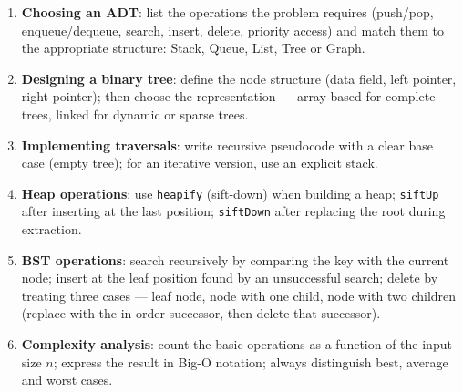 \documentclass[11pt]{article}
\begin{document}
\begin{methode}
\begin{enumerate}
\item \textbf{Choosing an ADT}: list the operations the problem requires (push/pop, enqueue/dequeue, search, insert, delete, priority access) and match them to the appropriate structure: Stack, Queue, List, Tree or Graph.
\item \textbf{Designing a binary tree}: define the node structure (data field, left pointer, right pointer); then choose the representation — array-based for complete trees, linked for dynamic or sparse trees.
\item \textbf{Implementing traversals}: write recursive pseudocode with a clear base case (empty tree); for an iterative version, use an explicit stack.
\item \textbf{Heap operations}: use \texttt{heapify} (sift-down) when building a heap; \texttt{siftUp} after inserting at the last position; \texttt{siftDown} after replacing the root during extraction.
\item \textbf{BST operations}: search recursively by comparing the key with the current node; insert at the leaf position found by an unsuccessful search; delete by treating three cases — leaf node, node with one child, node with two children (replace with the in-order successor, then delete that successor).
\item \textbf{Complexity analysis}: count the basic operations as a function of the input size $n$; express the result in Big-O notation; always distinguish best, average and worst cases.
\end{enumerate}
\end{methode}
\end{document}
